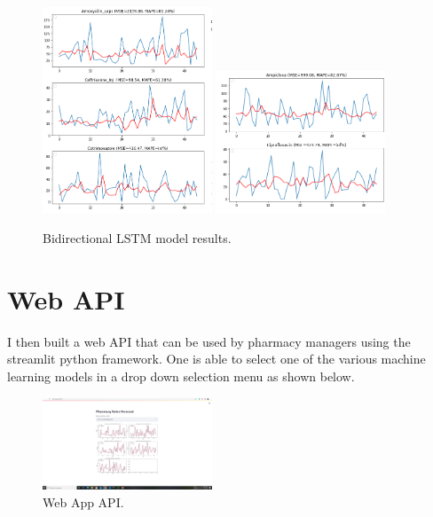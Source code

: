 \documentclass[12pt]{report}
\begin{document}
\begin{figure}[H]%
\begin {center}
\includegraphics[width=0.45\textwidth]{images/bi (5).png}
\includegraphics[width=0.45\textwidth]{images/bi (6).png}
\caption{Bidirectional LSTM model results.}
\label{fig:ecg}
\end {center}
\end{figure}

\section{Web API}
I then built a web API that can be used by pharmacy managers using the streamlit python framework. One is able to select one of the various machine learning models in a drop down selection menu as shown below.
\begin{figure}[H]%
  \begin {center}
  \includegraphics[width=0.45\textwidth]{images/WebApp.PNG}
  \caption{Web App API.}
  \label{fig:ecg}
  \end {center}
  \end{figure}
\end{document}
